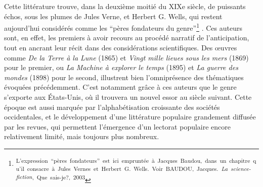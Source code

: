 \documentclass[letterpaper,portrait,12pt]{article}
\begin{document}
	Cette litt\'{e}rature trouve, dans la deuxi\`{e}me moiti\'{e} du XIXe si\`{e}cle, de puissants \'{e}chos, sous les plumes de Jules Verne, et Herbert G. Wells, qui restent aujourd'hui consid\'{e}r\'{e}s comme les {``}p\`{e}res fondateurs du genre''\footnote{\textsuperscript{\newpage
}\textsuperscript{	}\textsuperscript{{\tiny L'expression\ {``}p\`{e}res\ fondateurs''\ est\ ici\ emprunt\'{e}e\ \`{a}\ Jacques\ Baudou,\ dans\ un\ chapitre\ qu'il\ consacre\ \`{a}\ Jules\ Vernes\ et\ Herbert\ G.\ Wells.\ Voir\ BAUDOU,\ Jacques.\ }}\emph{\textsuperscript{{\tiny La\ science-fiction}}}\textsuperscript{{\tiny ,\ Que\ sais-je?,\ 2003}}} . Ces auteurs sont, en effet, les premiers \`{a} avoir recours au proc\'{e}d\'{e} narratif de l'anticipation, tout en ancrant leur r\'{e}cit dans des consid\'{e}rations scientifiques. Des \oe{}uvres comme \emph{De la Terre \`{a} la Lune} (1865) et \emph{Vingt mille lieues sous les mers} (1869) pour le premier, ou \emph{La Machine \`{a} explorer le temps }(1895) et \emph{La guerre des mondes }(1898) pour le second, illustrent bien l'omnipr\'{e}sence des th\'{e}matiques \'{e}voqu\'{e}es pr\'{e}c\'{e}demment. C'est notamment gr\^{a}ce \`{a} ces auteurs que le genre s'exporte aux \'{E}tats-Unis, où il trouvera un nouvel essor au si\`{e}cle suivant. Cette \'{e}poque est aussi marqu\'{e}e par l'alphab\'{e}tisation croissante des soci\'{e}t\'{e}s occidentales, et le d\'{e}veloppement d'une litt\'{e}rature populaire grandement diffus\'{e}e par les revues, qui permettent l'\'{e}mergence d'un lectorat populaire encore relativement limit\'{e}, mais toujours plus nombreux.
\end{document}

